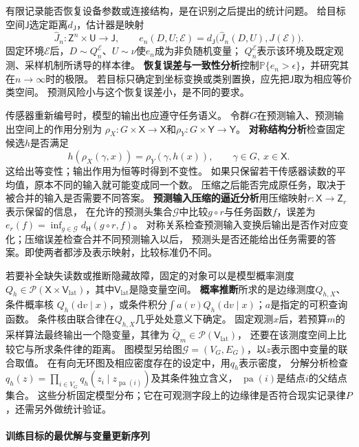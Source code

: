 有限记录能否恢复设备参数或连接结构，是在识别之后提出的统计问题。
给目标空间$\mathsf J$选定距离$d_{\mathsf J}$，估计器是映射
\[
  \widehat J_n:\mathsf Z^n\times\mathsf U\to\mathsf J,
  \qquad
  e_n(D,U;\mathcal E)=
  d_{\mathsf J}\bigl(\widehat J_n(D,U),J(\mathcal E)\bigr).
\]
固定环境$\mathcal E$后，$D\sim Q_n^{\mathcal E}$、$U\sim\nu$使$e_n$成为非负随机变量；
$Q_n^{\mathcal E}$表示该环境及既定观测、采样机制所诱导的样本律。
\textbf{恢复误差与一致性分析}控制$\mathbb P\{e_n>\epsilon\}$，并研究其在$n\to\infty$时的极限。
若目标只确定到坐标变换或类别置换，应先把$\mathsf J$取为相应等价类空间。
预测风险小与这个恢复误差小，是不同的要求。

传感器重新编号时，模型的输出也应遵守任务语义。
令群$G$在预测输入、预测输出空间上的作用分别为
$\rho_X:G\times\mathsf X\to\mathsf X$和$\rho_Y:G\times\mathsf Y\to\mathsf Y$。
\textbf{对称结构分析}检查固定候选$h$是否满足
\[
  h(\rho_X(\gamma,x))=\rho_Y(\gamma,h(x)),
  \qquad \gamma\in G,\ x\in\mathsf X.
\]
这给出等变性；输出作用为恒等时得到不变性。
如果只保留若干传感器读数的平均值，原本不同的输入就可能变成同一个数。
压缩之后能否完成原任务，取决于被合并的输入是否需要不同答案。
\textbf{预测输入压缩的逼近分析}用压缩映射$r:\mathsf X\to\mathsf Z_r$表示保留的信息，
在允许的预测头集合$\mathcal G$中比较$g\circ r$与任务函数$f$，误差为
$e_r(f)=\inf_{g\in\mathcal G}d_{\mathsf H}(g\circ r,f)$。
对称关系检查预测输入变换后输出是否作对应变化；压缩误差检查合并不同预测输入以后，
预测头是否还能给出任务需要的答案。即使两者都涉及表示映射，比较标准仍不同。

若要补全缺失读数或推断隐藏故障，固定的对象可以是模型概率测度
$Q_h\in\mathcal P(\mathsf X\times\mathsf V_{\mathrm{lat}})$，其中$\mathsf V_{\mathrm{lat}}$是隐变量空间。
\textbf{概率推断}所求的是边缘测度$Q_{h,X}$、条件概率核
$Q_h(\mathrm dv\mid x)$，或条件积分$\int a(v)Q_h(\mathrm dv\mid x)$；$a$是指定的可积查询函数。
条件核由联合律在$Q_{h,X}$几乎处处意义下确定。
固定观测$x$后，若预算$m$的采样算法最终输出一个隐变量，其律为
$\widetilde Q_m\in\mathcal P(\mathsf V_{\mathrm{lat}})$，
还要在该测度空间上比较它与所求条件律的距离。
图模型另给图$\mathcal G=(V_G,E_G)$，以$z$表示图中变量的联合取值。
在有向无环图及相应密度存在的设定中，用$q_h$表示密度，
分解分析检查$q_h(z)=\prod_{i\in V_G}q_h(z_i\mid z_{\operatorname{pa}(i)})$及其条件独立含义，
$\operatorname{pa}(i)$是结点$i$的父结点集合。
这些分析固定模型分布；它在可观测字段上的边缘律是否符合现实记录律$P$，还需另外做统计验证。

\paragraph{训练目标的最优解与变量更新序列}
\label{sec:future-ml-training-solving}

